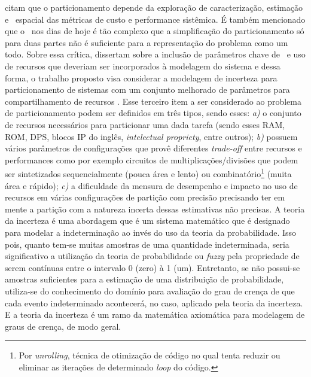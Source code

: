    \citet{Wang2016} citam que o particionamento depende da exploração de caracterização, estimação e \design\ espacial das métricas de custo e performance sistêmica. 
   É também mencionado que o \codesign\ nos dias de hoje é tão complexo que a simplificação do particionamento só para duas partes não é suficiente para a representação do problema como um todo. 
   Sobre essa crítica, dissertam sobre a inclusão de parâmetros chave de \design\ e uso de recursos que deveriam ser incorporados à modelagem do sistema e dessa forma, o trabalho proposto visa considerar a modelagem de incerteza para particionamento de sistemas com um conjunto melhorado de parâmetros para compartilhamento de recursos \hs.
   Esse terceiro item a ser considerado ao problema de particionamento podem ser definidos em três tipos, sendo esses: 
   \textit{a)} o conjunto de recursos necessários para particionar uma dada tarefa (sendo esses RAM, ROM, DPS, blocos IP do inglês, \textit{intelectual propriety}, entre outros); 
   \textit{b)} possuem vários parâmetros de configurações que provê diferentes \textit{trade-off} entre recursos e performances como por exemplo circuitos de multiplicações/divisões que podem ser sintetizados sequencialmente (pouca área e lento) ou combinatório\footnote{Por \textit{unrolling}, técnica de otimização de código no qual tenta reduzir ou eliminar as iterações de determinado \textit{loop} do código.} (muita área e rápido); 
   \textit{c)} a dificuldade da mensura de desempenho e impacto no uso de recursos em várias configurações de partição com precisão precisando ter em mente a partição com a natureza incerta dessas estimativas não precisas.
   A teoria da incerteza é uma abordagem que é um sistema matemático que é designado para modelar a indeterminação ao invés do uso da teoria da probabilidade. 
   Isso pois, quanto tem-se muitas amostras de uma quantidade indeterminada, seria significativo a utilização da teoria de probabilidade ou \textit{fuzzy} pela propriedade de serem contínuas entre o intervalo 0 (zero) à 1 (um). 
   Entretanto, se não possui-se amostras suficientes para a estimação de uma distribuição de probabilidade, utiliza-se do conhecimento do domínio para avaliação do grau de crença de que cada evento indeterminado acontecerá, no caso, aplicado pela teoria da incerteza. 
   E a teoria da incerteza é um ramo da matemática axiomática para modelagem de graus de crença, de modo geral.
   
